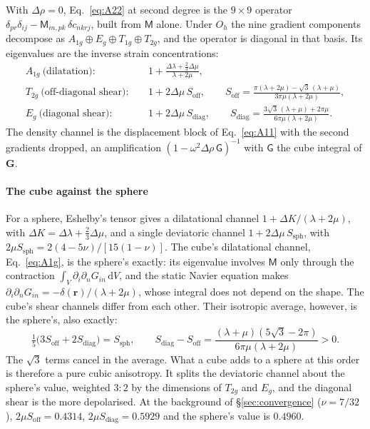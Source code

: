 \documentclass[preprint,review,12pt]{elsarticle}
\newcommand{\bG}{\mathbf{G}}
\newcommand{\dd}{\mathrm{d}}
\begin{document}
With $\Delta\rho=0$, Eq.~\eqref{eq:A22} at second degree is the $9\times9$ operator
$\delta_{pr}\delta_{ij}-\mathsf M_{in,pk}\,\delta c_{nkrj}$, built from $\mathsf M$ alone. Under
$O_h$ the nine gradient components decompose as $A_{1g}\oplus E_g\oplus T_{1g}\oplus T_{2g}$, and
the operator is diagonal in that basis. Its eigenvalues are the inverse strain concentrations:
\begin{align}
A_{1g}\ \text{(dilatation)}:&\quad 1+\frac{\Delta\lambda+\tfrac23\Delta\mu}{\lambda+2\mu},
  \label{eq:A1g}\\
T_{2g}\ \text{(off-diagonal shear)}:&\quad 1+2\Delta\mu\,S_{\text{off}},\qquad
  S_{\text{off}}=\frac{\pi(\lambda+2\mu)-\sqrt3\,(\lambda+\mu)}{3\pi\mu(\lambda+2\mu)},
  \label{eq:T2g}\\
E_{g}\ \text{(diagonal shear)}:&\quad 1+2\Delta\mu\,S_{\text{diag}},\qquad
  S_{\text{diag}}=\frac{3\sqrt3\,(\lambda+\mu)+2\pi\mu}{6\pi\mu(\lambda+2\mu)}.
  \label{eq:Eg}
\end{align}
The density channel is the displacement block of Eq.~\eqref{eq:A11} with the second gradients
dropped, an amplification $(1-\omega^2\Delta\rho\,\mathsf G)^{-1}$ with $\mathsf G$ the cube
integral of $\bG$.

\paragraph{The cube against the sphere} For a sphere, Eshelby's tensor gives a dilatational
channel $1+\Delta K/(\lambda+2\mu)$, with $\Delta K=\Delta\lambda+\tfrac23\Delta\mu$, and a single
deviatoric channel $1+2\Delta\mu\,S_{\text{sph}}$, with $2\mu S_{\text{sph}}=2(4-5\nu)/[15(1-\nu)]$.
The cube's dilatational channel, Eq.~\eqref{eq:A1g}, is the sphere's exactly: its eigenvalue
involves $\mathsf M$ only through the contraction $\int_V\partial_i\partial_nG_{in}\,\dd V$, and the
static Navier equation makes $\partial_i\partial_nG_{in}=-\delta(\mathbf r)/(\lambda+2\mu)$, whose
integral does not depend on the shape. The
cube's shear channels differ from each other. Their isotropic average, however, is the sphere's,
also exactly:
\begin{equation}\label{eq:shearsplit}
  \tfrac15\bigl(3S_{\text{off}}+2S_{\text{diag}}\bigr)=S_{\text{sph}},\qquad
  S_{\text{diag}}-S_{\text{off}}=\frac{(\lambda+\mu)(5\sqrt3-2\pi)}{6\pi\mu(\lambda+2\mu)}>0 .
\end{equation}
The $\sqrt3$ terms cancel in the average. What a cube adds to a sphere at this order is therefore
a pure cubic anisotropy. It splits the deviatoric channel about the sphere's value, weighted $3:2$
by the dimensions of $T_{2g}$ and $E_g$, and the diagonal shear is the more depolarised. At the background of
\S\ref{sec:convergence} ($\nu=7/32$), $2\mu S_{\text{off}}=0.4314$, $2\mu S_{\text{diag}}=0.5929$
and the sphere's value is $0.4960$.
\end{document}
